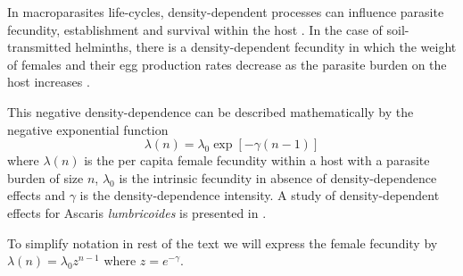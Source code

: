 \documentclass[12pt,a4paper]{article}
\theoremstyle{plain}%
\theoremstyle{definition}
\theoremstyle{remark}
\begin{document}
In macroparasites life-cycles, density-dependent processes can influence parasite fecundity, establishment and survival within the host .  In the case of soil-transmitted helminths, there is a density-dependent fecundity in which the weight of females and their egg production rates decrease as the parasite burden on the host increases \cite{churcher2006density,walker2009density}.
	
	This negative density-dependence can be described mathematically by the negative exponential function
	\begin{equation}
	\lambda(n)=\lambda_0 \exp[-\gamma(n-1)]
	\end{equation} 
	where $\lambda(n)$ is the per capita female fecundity within a host with a parasite burden of size $n$,
	$\lambda_0$ is the intrinsic fecundity in absence of density-dependence effects and 
	$\gamma$ is the density-dependence intensity. 
	A study {\color{black} of density-dependent effects } for Ascaris \textit{lumbricoides} is presented in \citep{hall2000geographical}.
	
	To simplify notation in rest of the text we will express the female fecundity by $\lambda(n)=\lambda_0 z^{n-1}$ where $z=e^{-\gamma}$.
	
	
	
\end{document}

